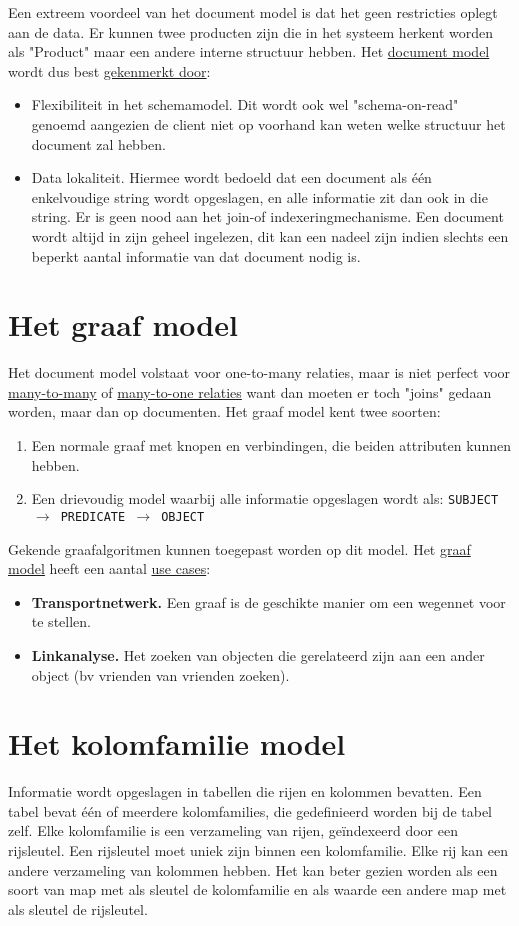 	Een extreem voordeel van het document model is dat het geen restricties oplegt aan de data. Er kunnen twee producten zijn die in het systeem herkent worden als "Product" maar een andere interne structuur hebben. Het \underline{document model} wordt dus best \underline{gekenmerkt door}:
	\begin{itemize}
		\item[\info]Flexibiliteit in het schemamodel. Dit wordt ook wel "schema-on-read" genoemd aangezien de client niet op voorhand kan weten welke structuur het document zal hebben.
		\item[\info]Data lokaliteit. Hiermee wordt bedoeld dat een document als één enkelvoudige string wordt opgeslagen, en alle informatie zit dan ook in die string. Er is geen nood aan het join-of indexeringmechanisme. Een document wordt altijd in zijn geheel ingelezen, dit kan een nadeel zijn indien slechts een beperkt aantal informatie van dat document nodig is.
	\end{itemize}

	\section{Het graaf model}
	Het document model volstaat voor one-to-many relaties, maar is niet perfect voor \underline{many-to-many} of \underline{many-to-one relaties} want dan moeten er toch "joins" gedaan worden, maar dan op documenten. Het graaf model kent twee soorten:
	\begin{enumerate}
		\item Een normale graaf met knopen en verbindingen, die beiden attributen kunnen hebben.
		\item Een drievoudig model waarbij alle informatie opgeslagen wordt als: \texttt{SUBJECT $\rightarrow$ PREDICATE $\rightarrow$ OBJECT}
	\end{enumerate}
	Gekende graafalgoritmen kunnen toegepast worden op dit model. Het \underline{graaf model} heeft een aantal \underline{use cases}:
	\begin{itemize}
		\item[\info]\textbf{Transportnetwerk.} Een graaf is de geschikte manier om een wegennet voor te stellen.
		\item[\info]\textbf{Linkanalyse.} Het zoeken van objecten die gerelateerd zijn aan een ander object (bv vrienden van vrienden zoeken).
	\end{itemize}

	\section{Het kolomfamilie model}
	Informatie wordt opgeslagen in tabellen die rijen en kolommen bevatten. Een tabel bevat één of meerdere kolomfamilies, die gedefinieerd worden bij de tabel zelf. Elke kolomfamilie is een verzameling van rijen, geïndexeerd door een rijsleutel. Een rijsleutel moet uniek zijn binnen een kolomfamilie. Elke rij kan een andere verzameling van kolommen hebben. Het kan beter gezien worden als een soort van map met als sleutel de kolomfamilie en als waarde een andere map met als sleutel de rijsleutel.
